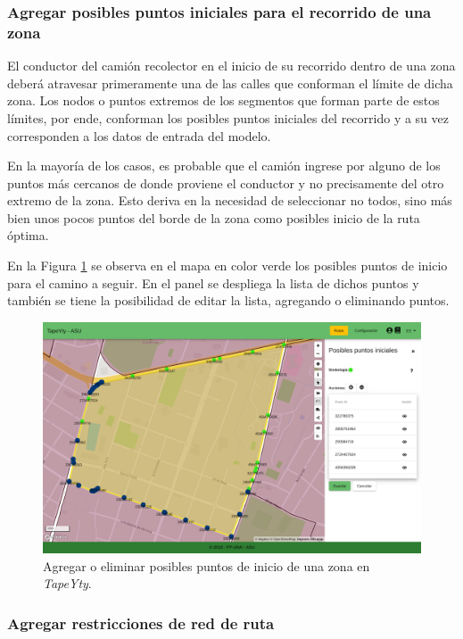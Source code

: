 \subsubsection{Agregar posibles puntos iniciales para el recorrido de una zona}

El conductor del camión recolector en el inicio de su recorrido dentro de una zona deberá atravesar primeramente una de las calles que conforman el límite de dicha zona. Los nodos o puntos extremos de los segmentos que forman parte de estos límites, por ende, conforman los posibles puntos iniciales del recorrido y a su vez corresponden a los datos de entrada del modelo. 

En la mayoría de los casos, es probable que el camión ingrese por alguno de los puntos más cercanos de donde proviene el conductor y no precisamente del otro extremo de la zona. Esto deriva en la necesidad de seleccionar no todos, sino más bien unos pocos puntos del borde de la zona como posibles inicio de la ruta óptima.

En la Figura \ref{fig:puntosIniciales} se observa en el mapa en color verde los posibles puntos de inicio para el camino a seguir. En el panel se despliega la lista de dichos puntos y también se tiene la posibilidad de editar la lista, agregando o eliminando puntos.

\begin{figure}[H]
\centerline{\includegraphics[width=\textwidth]{puntosIniciales.png}}
\caption{Agregar o eliminar posibles puntos de inicio de una zona en \textit{TapeYty}.}
\label{fig:puntosIniciales}
\end{figure}

\subsubsection{Agregar restricciones de red de ruta}

